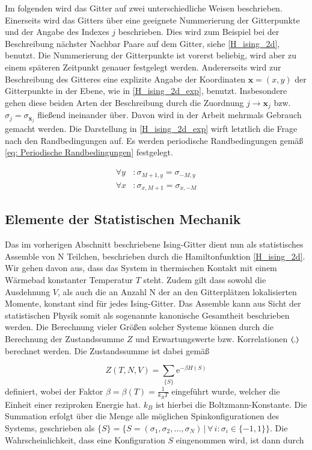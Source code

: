 \noindent Im folgenden wird das Gitter auf zwei unterschiedliche Weisen beschrieben. Einerseits wird das Gitters über eine geeignete Nummerierung der Gitterpunkte und der Angabe des Indexes $j$ beschrieben. Dies wird zum Beispiel bei der Beschreibung nächster Nachbar Paare auf dem Gitter, siehe \eqref{H_ising_2d}, benutzt. Die Nummerierung der Gitterpunkte ist vorerst beliebig, wird aber zu einem späteren Zeitpunkt genauer festgelegt werden. Andererseits wird zur Beschreibung des Gitteres eine explizite Angabe der Koordinaten $\bm{x} = (x,y)$ der Gitterpunkte in der Ebene, wie in \eqref{H_ising_2d_exp}, benutzt. Insbesondere gehen diese beiden Arten der Beschreibung durch die Zuordnung $j \rightarrow \bm{x}_j$ bzw. $\sigma_j = \sigma_{\bm{x}_j}$ fließend ineinander über. Davon wird in der Arbeit mehrmals Gebrauch gemacht werden. 
Die Darstellung in \eqref{H_ising_2d_exp} wirft letztlich die Frage nach den Randbedingungen auf. Es werden periodische Randbedingungen gemäß \eqref{eq: Periodische Randbedingungen} festgelegt. 

\begin{equation} \label{eq: Periodische Randbedingungen}
\begin{aligned} 
\forall y & : \sigma_{M+1, y} =  \sigma_{-M, y} \\
\forall x & : \sigma_{x, M+1} =  \sigma_{x, -M}
\end{aligned}
\end{equation}

\subsection{Elemente der Statistischen Mechanik}

Das im vorherigen Abschnitt beschriebene Ising-Gitter dient nun als statistisches Assemble von N Teilchen, beschrieben durch die Hamiltonfunktion \eqref{H_ising_2d}. Wir gehen davon aus, dass das System in thermischen Kontakt mit einem Wärmebad konstanter Temperatur $T$ steht. Zudem gilt dass sowohl die Ausdehnung $V$, als auch die an Anzahl N der an den Gitterplätzen lokalisierten Momente, konstant sind für jedes Ising-Gitter. Das Assemble kann aus Sicht der statistischen Physik somit als sogenannte kanonische Gesamtheit beschrieben werden. Die Berechnung vieler Größen solcher Systeme können durch die Berechnung der Zustandssumme $Z$ und Erwartungswerte bzw. Korrelationen $\left\langle . \right\rangle$ berechnet werden. Die Zustandssumme ist dabei gemäß

\begin{equation} \label{def: sp_zustandssumme}
 Z(T,N,V) = \sum_{\{S\}} \mathrm{e}^{-\beta H( S ) } 
\end{equation}
definiert, wobei der Faktor $\beta = \beta\left(T\right) = \frac{1}{k_B T} $ eingeführt wurde, welcher die Einheit einer reziproken Energie hat. $k_B$ ist hierbei die Boltzmann-Konstante. Die Summation erfolgt über die Menge alle möglichen Spinkonfigurationen des Systems, geschrieben als $\{S\} = \{S = (\sigma_1, \sigma_2, \dots,\sigma_N) \,\vert\, \forall\,i : \sigma_i \in \{-1, 1\}\}$. Die Wahrscheinlichkeit, dass eine Konfiguration $S$ eingenommen wird, ist dann durch

